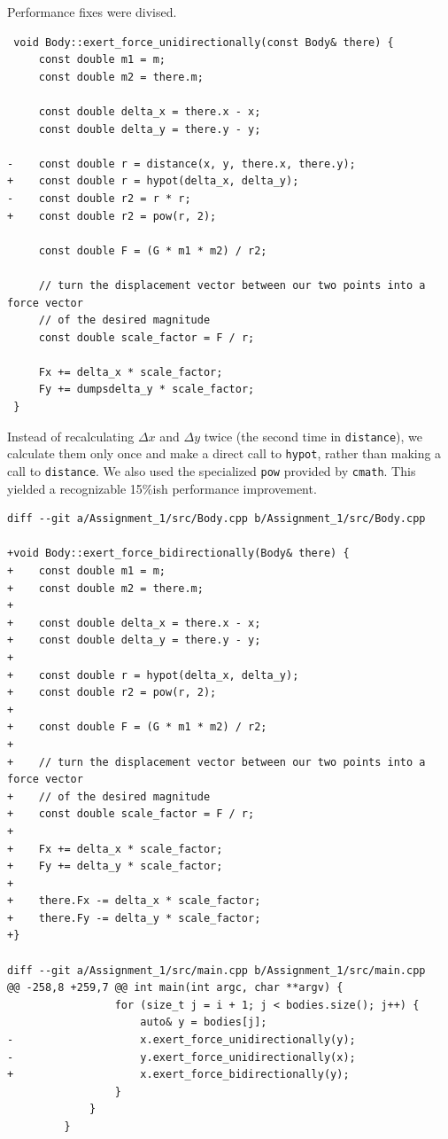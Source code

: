 \documentclass[11pt,a4paper]{article}
\begin{document}
Performance fixes were divised.

\begin{verbatim}
 void Body::exert_force_unidirectionally(const Body& there) {
     const double m1 = m;
     const double m2 = there.m;

     const double delta_x = there.x - x;
     const double delta_y = there.y - y;
     
-    const double r = distance(x, y, there.x, there.y);
+    const double r = hypot(delta_x, delta_y);
-    const double r2 = r * r;
+    const double r2 = pow(r, 2);

     const double F = (G * m1 * m2) / r2;

     // turn the displacement vector between our two points into a force vector
     // of the desired magnitude
     const double scale_factor = F / r;

     Fx += delta_x * scale_factor;
     Fy += dumpsdelta_y * scale_factor;
 }
\end{verbatim}

Instead of recalculating $\Delta x$ and $\Delta y$ twice (the second time in \texttt{distance}), we calculate them only once and make a direct call to \texttt{hypot}, rather than making a call to \texttt{distance}. We also used the specialized \texttt{pow} provided by \texttt{cmath}. This yielded a recognizable 15\%ish performance improvement. 

\begin{verbatim}
diff --git a/Assignment_1/src/Body.cpp b/Assignment_1/src/Body.cpp

+void Body::exert_force_bidirectionally(Body& there) {
+    const double m1 = m;
+    const double m2 = there.m;
+
+    const double delta_x = there.x - x;
+    const double delta_y = there.y - y;
+
+    const double r = hypot(delta_x, delta_y);
+    const double r2 = pow(r, 2);
+
+    const double F = (G * m1 * m2) / r2;
+
+    // turn the displacement vector between our two points into a force vector
+    // of the desired magnitude
+    const double scale_factor = F / r;
+
+    Fx += delta_x * scale_factor;
+    Fy += delta_y * scale_factor;
+
+    there.Fx -= delta_x * scale_factor;
+    there.Fy -= delta_y * scale_factor;
+}

diff --git a/Assignment_1/src/main.cpp b/Assignment_1/src/main.cpp
@@ -258,8 +259,7 @@ int main(int argc, char **argv) {
                 for (size_t j = i + 1; j < bodies.size(); j++) {
                     auto& y = bodies[j];
-                    x.exert_force_unidirectionally(y);
-                    y.exert_force_unidirectionally(x);
+                    x.exert_force_bidirectionally(y);
                 }
             }
         }
\end{verbatim}
\end{document}
